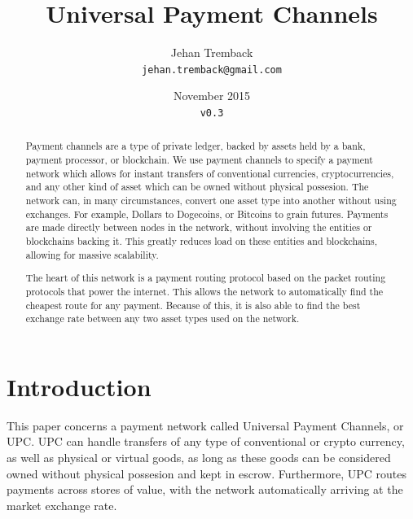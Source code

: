 \documentclass[a4paper]{article}
\title{Universal Payment Channels}
\author{Jehan Tremback\\
  \texttt{jehan.tremback@gmail.com}\\}
\date{November 2015\\
\texttt{v0.3}}
\begin{document}
\maketitle


\begin{abstract}
Payment channels are a type of private ledger, backed by assets held by a bank, payment processor, or blockchain. We use payment channels to specify a payment network which allows for instant transfers of conventional currencies, cryptocurrencies, and any other kind of asset which can be owned without physical possesion. The network can, in many circumstances, convert one asset type into another without using exchanges. For example, Dollars to Dogecoins, or Bitcoins to grain futures. Payments are made directly between nodes in the network, without involving the entities or blockchains backing it. This greatly reduces load on these entities and blockchains, allowing for massive scalability.

The heart of this network is a payment routing protocol based on the packet routing protocols that power the internet. This allows the network to automatically find the cheapest route for any payment. Because of this, it is also able to find the best exchange rate between any two asset types used on the network.
\end{abstract}

\section*{Introduction}

This paper concerns a payment network called Universal Payment Channels, or UPC. UPC can handle transfers of any type of conventional or crypto currency, as well as physical or virtual goods, as long as these goods can be considered owned without physical possesion and kept in escrow. Furthermore, UPC routes payments across stores of value, with the network automatically arriving at the market exchange rate.
\end{document}
